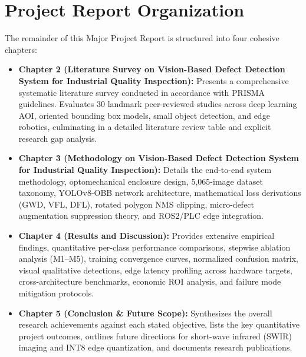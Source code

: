 \section{Project Report Organization}
\label{sec:org}

The remainder of this Major Project Report is structured into four cohesive chapters:

\begin{itemize}
\item \textbf{Chapter 2 (Literature Survey on Vision-Based Defect Detection System for Industrial Quality Inspection):} Presents a comprehensive systematic literature survey conducted in accordance with PRISMA guidelines. Evaluates 30 landmark peer-reviewed studies across deep learning AOI, oriented bounding box models, small object detection, and edge robotics, culminating in a detailed literature review table and explicit research gap analysis.
\item \textbf{Chapter 3 (Methodology on Vision-Based Defect Detection System for Industrial Quality Inspection):} Details the end-to-end system methodology, optomechanical enclosure design, 5,065-image dataset taxonomy, YOLOv8-OBB network architecture, mathematical loss derivations (GWD, VFL, DFL), rotated polygon NMS clipping, micro-defect augmentation suppression theory, and ROS2/PLC edge integration.
\item \textbf{Chapter 4 (Results and Discussion):} Provides extensive empirical findings, quantitative per-class performance comparisons, stepwise ablation analysis (M1--M5), training convergence curves, normalized confusion matrix, visual qualitative detections, edge latency profiling across hardware targets, cross-architecture benchmarks, economic ROI analysis, and failure mode mitigation protocols.
\item \textbf{Chapter 5 (Conclusion \& Future Scope):} Synthesizes the overall research achievements against each stated objective, lists the key quantitative project outcomes, outlines future directions for short-wave infrared (SWIR) imaging and INT8 edge quantization, and documents research publications.
\end{itemize}
